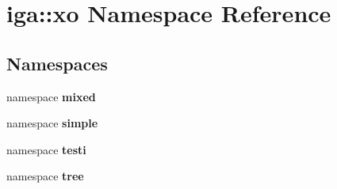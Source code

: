 \section{iga::xo Namespace Reference}
\label{namespaceiga_1_1xo}


\subsection*{Namespaces}
\begin{CompactItemize}
\item 
namespace {\bf mixed}
\item 
namespace {\bf simple}
\item 
namespace {\bf testi}
\item 
namespace {\bf tree}
\end{CompactItemize}
